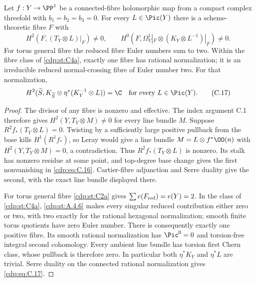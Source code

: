 
\begin{proposition}\label{cdp:st:C4b}
Let $f:Y\to\PP^1$ be a connected-fibre holomorphic map from a compact complex threefold with $b_1=b_2=b_3=0$. For every $L\in\Pic(Y)$ there is a scheme-theoretic fibre $F$ with
\[
 H^2(F,(T_Y\otimes L)|_F)\ne0,\qquad
 H^0(F,\Omega_Y^1|_F\otimes(K_Y\otimes L^{-1})|_F)\ne0. \tag{C.16}\label{cdp:eq:C.16}
\]
For torus general fibre the reduced fibre Euler numbers sum to two. Within the fibre class of \ref{cdp:st:C4a}, exactly one fibre has rational normalization; it is an irreducible reduced normal-crossing fibre of Euler number two. For that normalization,
\[
H^2(\widetilde S,K_{\widetilde S}\otimes
             \eta^*(K_Y^{-1}\otimes L))=\C
\quad\hbox{for every }L\in\Pic(Y).                    \tag{C.17}\label{cdp:eq:C.17}
\]
\end{proposition}
\begin{proof}
The divisor of any fibre is nonzero and effective. The index argument C.1 therefore gives $H^2(Y,T_Y\otimes M)\ne0$ for every line bundle $M$. Suppose $R^2f_*(T_Y\otimes L)=0$. Twisting by a sufficiently large positive pullback from the base kills $H^1(R^1f_*)$, so Leray would give a line bundle $M=L\otimes f^*\OO(n)$ with $H^2(Y,T_Y\otimes M)=0$, a contradiction. Thus $R^2f_*(T_Y\otimes L)$ is nonzero. Its stalk has nonzero residue at some point, and top-degree base change gives the first nonvanishing in \eqref{cdp:eq:C.16}. Cartier-fibre adjunction and Serre duality give the second, with the exact line bundle displayed there.

For torus general fibre \ref{cdp:st:C2a} gives $\sum e(F_{\rm red})=e(Y)=2$. In the class of \ref{cdp:st:C4a}, \ref{cdp:st:A.4.6} makes every singular reduced contribution either zero or two, with two exactly for the rational hexagonal normalization; smooth finite torus quotients have zero Euler number. There is consequently exactly one positive fibre. Its smooth rational normalization has $\Pic^0=0$ and torsion-free integral second cohomology. Every ambient line bundle has torsion first Chern class, whose pullback is therefore zero. In particular both $\eta^*K_Y$ and $\eta^*L$ are trivial. Serre duality on the connected rational normalization gives \eqref{cdp:eq:C.17}.
\end{proof}



